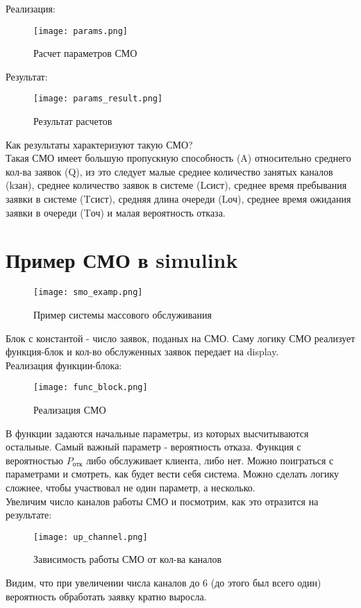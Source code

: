 Реализация:

\begin{figure}[H]
    \centering
    \texttt{[image: params.png]}
    \caption{Расчет параметров СМО}
\end{figure}

Результат:

\begin{figure}[H]
    \centering
    \texttt{[image: params\_result.png]}
    \caption{Результат расчетов}
\end{figure}

Как результаты характеризуют такую СМО? \\

Такая СМО имеет большую пропускную способность (A) относительно среднего кол-ва заявок (Q), из это следует малые среднее количество занятых каналов (kзан),
среднее количество заявок в системе (Lсист), среднее время пребывания заявки в системе (Tсист), средняя длина очереди (Lоч), 
среднее время ожидания заявки в очереди (Tоч) и малая вероятность отказа.


\section*{\textbf{Пример СМО в simulink}}

\begin{figure}[H]
    \centering
    \texttt{[image: smo\_examp.png]}
    \caption{Пример системы массового обслуживания}
\end{figure}

Блок с константой - число заявок, поданых на СМО. Саму логику СМО реализует функция-блок и кол-во обслуженных заявок передает на
display. \\

Реализация функции-блока:

\begin{figure}[H]
    \centering
    \texttt{[image: func\_block.png]}
    \caption{Реализация СМО}
\end{figure}

В функции задаются начальные параметры, из которых высчитываются остальные. Самый важный параметр - вероятность отказа. Функция
с вероятностью $P_{отк}$ либо обслуживает клиента, либо нет. Можно поиграться с параметрами и смотреть, как будет вести себя система.
Можно сделать логику сложнее, чтобы участвовал не один параметр, а несколько. \\

Увеличим число каналов работы СМО и посмотрим, как это отразится на результате:

\begin{figure}[H]
    \centering
    \texttt{[image: up\_channel.png]}
    \caption{Зависимость работы СМО от кол-ва каналов}
\end{figure}

Видим, что при увеличении числа каналов до 6 (до этого был всего один) вероятность обработать заявку кратно выросла.

\endinput
